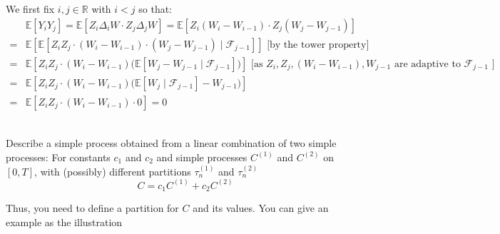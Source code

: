 \documentclass[12pt,twoside, letter]{exam}
\theoremstyle{definition}
\newcommand{\rr}{\mathbb{R}}
\newcommand{\ee}{\mathbb{E}}
\begin{document}
\begin{solution}
  We first fix $i, j \in \rr$ with $i < j$ so that:
  \begin{align*}
    &\ee[Y_{i}Y_{j}] = \ee[Z_{i}\Delta_{i}W \cdot Z_{j}\Delta_{j}W] = \ee[Z_{i}(W_{i}-W_{i-1}) \cdot Z_{j}(W_{j}-W_{j-1})] \\
    =& \ee[\ee[Z_{i}Z_{j}\cdot(W_{i}-W_{i-1})\cdot(W_{j}-W_{j-1}) \mid \mathcal{F}_{j-1}]] \text{ [by the tower property]} \\
    =& \ee[Z_{i}Z_{j}\cdot(W_{i}-W_{i-1})\big(\ee[W_{j}-W_{j-1} \mid \mathcal{F}_{j-1}]\big)]
    \text{ [as $Z_i, Z_j, (W_i-W_{i-1}), W_{j-1}$ are adaptive to $\mathcal{F}_{j-1}$ ]} \\
    =& \ee[Z_{i}Z_{j}\cdot(W_{i}-W_{i-1})\big(\ee[W_{j}\mid \mathcal{F}_{j-1}] -W_{j-1} \big)] \\
    =& \ee[Z_{i}Z_{j}\cdot(W_{i}-W_{i-1})\cdot 0] = 0
  \end{align*}
\end{solution}

\\
Describe a simple process obtained from a linear combination of two simple processes:
For constants $c_1$ and $c_2$ and simple processes $C^{(1)}$ and $C^{(2)}$ on $[0,T]$, with (possibly)
different partitions $\tau_{n}^{(1)}$ and $\tau_{n}^{(2)}$
  \begin{equation*}
    C = c_1C^{(1)} + c_2C^{(2)}
  \end{equation*}
  \par{Thus, you need to define a partition for $C$ and its values. You can give an example as the illustration}
\end{document}
